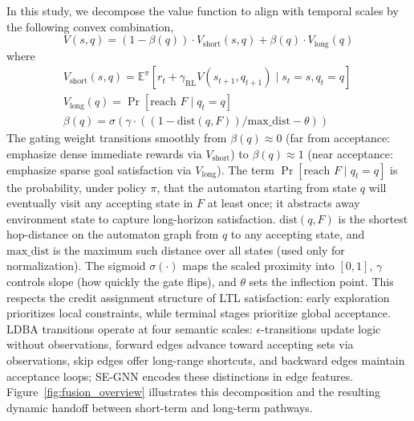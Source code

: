 \documentclass[journal]{IEEEtran}
\begin{document}
In this study, we decompose the value function to align with temporal scales by the following convex combination,
\begin{equation}
V(s, q) = (1 - \beta(q)) \cdot V_{\text{short}}(s, q) + \beta(q) \cdot V_{\text{long}}(q)
\label{eq:decomposition}
\end{equation}
where 
\begin{equation*}
    \begin{aligned}
&V_{\text{short}}(s, q) = \mathbb{E}^\pi[r_t + \gamma_{\text{RL}} V(s_{t+1}, q_{t+1}) \mid s_t = s, q_t = q] \quad  \\
&V_{\text{long}}(q) = \Pr[\text{reach } F \mid q_t = q] \\
&\beta(q) = \sigma\left(\gamma \cdot \left(({1 - \text{dist}(q, F)})/{\text{max\_dist}} - \theta\right)\right)
    \end{aligned}
\end{equation*}
The gating weight transitions smoothly from $\beta(q) \approx 0$ (far from acceptance: emphasize dense immediate rewards via $V_{\text{short}}$) to $\beta(q) \approx 1$ (near acceptance: emphasize sparse goal satisfaction via $V_{\text{long}}$). The term $\Pr[\text{reach } F \mid q_t = q]$ is the probability, under policy $\pi$, that the automaton starting from state $q$ will eventually visit any accepting state in $F$ at least once; it abstracts away environment state to capture long-horizon satisfaction. $\text{dist}(q, F)$ is the shortest hop-distance on the automaton graph from $q$ to any accepting state, and $\text{max\_dist}$ is the maximum such distance over all states (used only for normalization). The sigmoid $\sigma(\cdot)$ maps the scaled proximity into $[0,1]$, $\gamma$ controls slope (how quickly the gate flips), and $\theta$ sets the inflection point. This respects the credit assignment structure of LTL satisfaction: early exploration prioritizes local constraints, while terminal stages prioritize global acceptance. LDBA transitions operate at four semantic scales: $\epsilon$-transitions update logic without observations, forward edges advance toward accepting sets via observations, skip edges offer long-range shortcuts, and backward edges maintain acceptance loops; SE-GNN encodes these distinctions in edge features.
Figure~\ref{fig:fusion_overview} illustrates this decomposition and the resulting dynamic handoff between short-term and long-term pathways.
\end{document}
